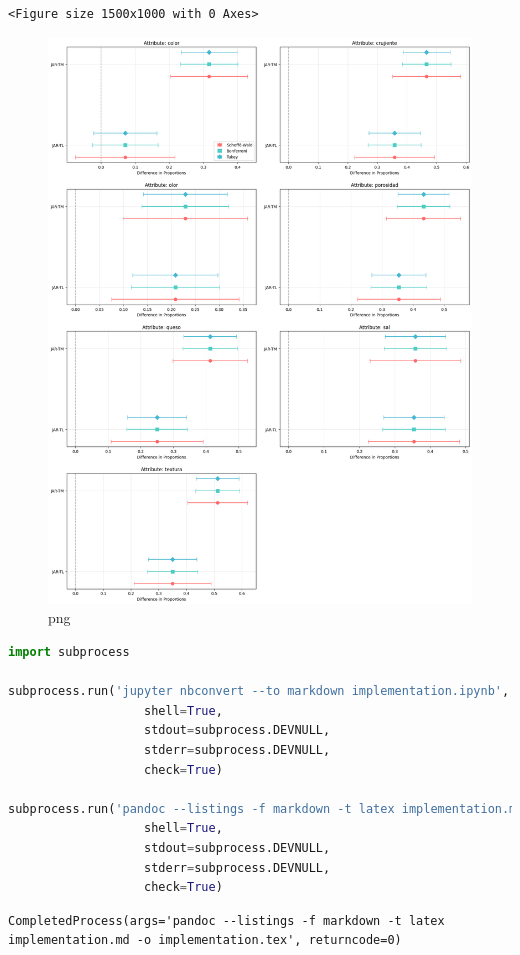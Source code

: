 \begin{lstlisting}
<Figure size 1500x1000 with 0 Axes>
\end{lstlisting}

\begin{figure}
\centering
\includegraphics{implementation_files/implementation_12_1.png}
\caption{png}
\end{figure}

\begin{lstlisting}[language=Python]
import subprocess

subprocess.run('jupyter nbconvert --to markdown implementation.ipynb', 
                   shell=True, 
                   stdout=subprocess.DEVNULL, 
                   stderr=subprocess.DEVNULL, 
                   check=True)

subprocess.run('pandoc --listings -f markdown -t latex implementation.md -o implementation.tex', 
                   shell=True, 
                   stdout=subprocess.DEVNULL, 
                   stderr=subprocess.DEVNULL, 
                   check=True)
\end{lstlisting}

\begin{lstlisting}
CompletedProcess(args='pandoc --listings -f markdown -t latex implementation.md -o implementation.tex', returncode=0)
\end{lstlisting}

